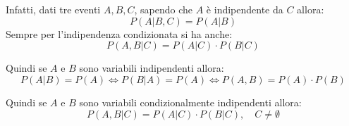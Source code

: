 Infatti, dati tre eventi $A, B, C$, sapendo che $A$ è indipendente da $C$ allora:
\begin{equation*}
    P(A | B, C) = P(A | B)
\end{equation*}
Sempre per l'indipendenza condizionata si ha anche:
\begin{equation*}
    P(A, B | C) = P(A | C) \cdot P(B | C)
\end{equation*}
\begin{nota}
    Quindi se $A$ e $B$ sono variabili indipendenti allora:
    \begin{equation*}
        P(A|B) = P(A) \iff P(B|A) = P(A) \iff P(A,B) = P(A)\cdot P(B)
    \end{equation*}
\end{nota}
\begin{nota}
    Quindi se $A$ e $B$ sono variabili condizionalmente indipendenti allora:
    \begin{equation*}
        P(A,B|C) = P(A|C) \cdot P(B|C), \quad C \neq \emptyset
    \end{equation*}
\end{nota}